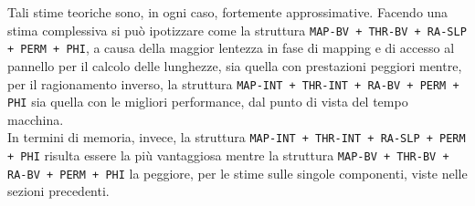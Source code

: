 Tali stime teoriche sono, in ogni caso, fortemente approssimative.
Facendo una stima complessiva si può ipotizzare come la struttura \texttt{MAP-BV
+ THR-BV + RA-SLP + PERM + PHI}, a causa della maggior lentezza in fase di
mapping e di accesso al pannello per il calcolo delle lunghezze, sia quella con
prestazioni peggiori mentre, per il ragionamento inverso, la struttura
\texttt{MAP-INT + THR-INT + RA-BV + PERM + PHI} sia quella con le migliori
performance, dal punto di vista del tempo macchina.\\
In termini di memoria, invece,  la struttura
\texttt{MAP-INT + THR-INT + RA-SLP + PERM + PHI} risulta essere la più
vantaggiosa mentre la struttura
\texttt{MAP-BV + THR-BV + RA-BV + PERM + PHI} la peggiore, per le stime sulle
singole componenti, viste
nelle sezioni precedenti. 
